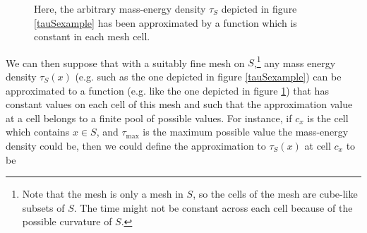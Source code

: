 \documentclass[12pt]{report}
\begin{document}
  \begin{figure}[ht!]
    \captionsetup{justification=justified}
    \centering
    
    \vspace*{2px}
    \caption[Approximated arbitrary mass-energy density]{Here, the arbitrary mass-energy density $\tau_S$ depicted in figure \ref{tauSexample} has been approximated by a function which is constant in each mesh cell.}\label{tauSapprox}
    \end{figure}
    We can then suppose that with a suitably fine mesh\label{meshref} on $S$,\footnote{Note that the mesh is only a mesh in $S$, so the cells of the mesh are cube-like subsets of $S$. The time might not be constant across each cell because of the possible curvature of $S$.} any mass energy density $\tau_S(x)$ (e.g. such as the one depicted in figure \ref{tauSexample}) can be approximated to a function (e.g. like the one depicted in figure \ref{tauSapprox}) that has constant values on each cell of this mesh and such that the approximation value at a cell belongs to a finite pool of possible values. For instance, if $c_x$ is the cell which contains $x\in S$, and $\tau_{\text{max}}$ is the maximum possible value the mass-energy density could be, then we could define the approximation to $\tau_S(x)$ at cell $c_x$ to be
\end{document}
